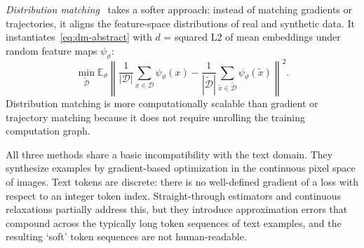\begin{foldable}
  \textit{Distribution matching}~\cite{zhao2023dataset,wang2022cafe} takes a softer approach: instead of matching gradients or trajectories, it aligns the feature-space distributions of real and synthetic data.
  It instantiates~\eqref{eq:dm-abstract} with $d$ = squared L2 of mean embeddings under random feature maps $\psi_\vartheta$:
  \begin{equation}
    \min_{\tilde{\mathcal{D}}} \mathbb{E}_\vartheta \left\| \frac{1}{|\mathcal{D}|} \sum_{x \in \mathcal{D}} \psi_\vartheta(x) - \frac{1}{|\tilde{\mathcal{D}}|} \sum_{\tilde{x} \in \tilde{\mathcal{D}}} \psi_\vartheta(\tilde{x}) \right\|^2.
    \label{eq:dm-objective}
  \end{equation}
  Distribution matching is more computationally scalable than gradient or trajectory matching because it does not require unrolling the training computation graph.
\end{foldable}

\begin{foldable}
  All three methods share a basic incompatibility with the text domain.
  They synthesize examples by gradient-based optimization in the continuous pixel space of images.
  Text tokens are discrete: there is no well-defined gradient of a loss with respect to an integer token index.
  Straight-through estimators and continuous relaxations partially address this, but they introduce approximation errors that compound across the typically long token sequences of text examples, and the resulting `soft' token sequences are not human-readable.
\end{foldable}

